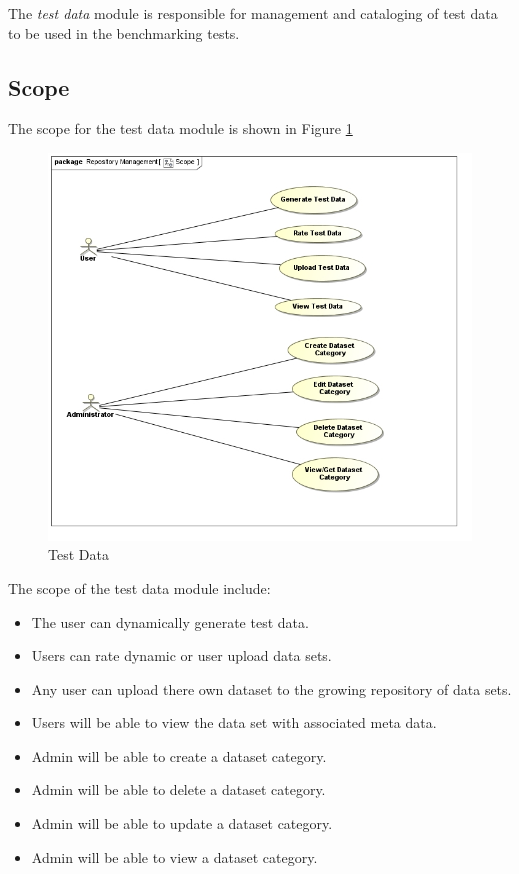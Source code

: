 The \textit{test data} module is responsible for management and cataloging of
test data to be used in the benchmarking tests.

\subsection{Scope}
The scope for the test data module is shown in Figure \ref{fig:testData}
\begin{figure}[H]
  \begin{center}
  \includegraphics[scale=0.7]{../Diagrams and Charts/Test Data/Scope.jpg}
  \caption{Test Data}
  \end{center}
  \label{fig:testData}
\end{figure}
The scope of the test data module include:
\begin{itemize}
	\item The user can dynamically generate test data.
	\item Users can rate dynamic or user upload data sets.
	\item Any user can upload there own dataset to the growing repository of data sets.
  \item Users will be able to view the data set with associated meta data.
  \item Admin will be able to create a dataset category.
  \item Admin will be able to delete a dataset category.
  \item Admin will be able to update a dataset category.
  \item Admin will be able to view a dataset category.
\end{itemize}

